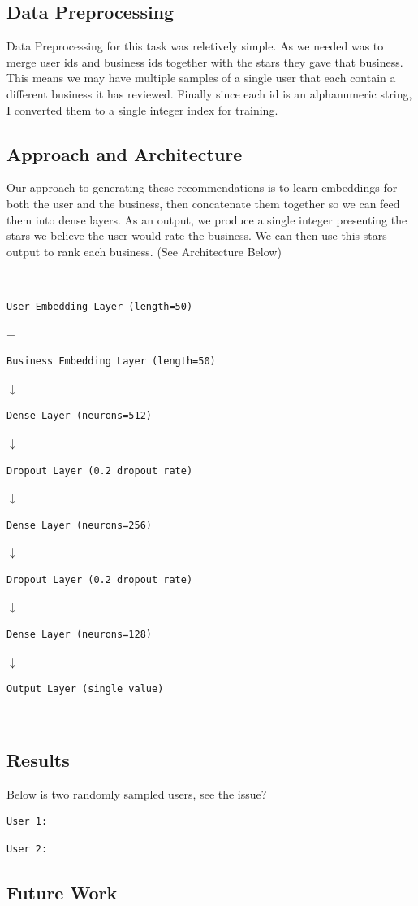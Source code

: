 \documentclass{article}
\begin{document}
\subsection*{Data Preprocessing}

Data Preprocessing for this task was reletively simple. As we needed was to merge user ids and business ids together with the stars they gave that business. This means we may have multiple samples of a single user that each contain a different business it has reviewed. Finally since each id is an alphanumeric string, I converted them to a single integer index for training.

\subsection*{Approach and Architecture}

Our approach to generating these recommendations is to learn embeddings for both the user and the business, then concatenate them together so we can feed them into dense layers. As an output, we produce a single integer presenting the stars we believe the user would rate the business. We can then use this stars output to rank each business. (See Architecture Below)

\mbox{}\\
\begin{verbatim}
User Embedding Layer (length=50)
\end{verbatim}
$+$
\begin{verbatim}
Business Embedding Layer (length=50)
\end{verbatim}
$\downarrow$
\begin{verbatim}
Dense Layer (neurons=512)
\end{verbatim}
$\downarrow$
\begin{verbatim}
Dropout Layer (0.2 dropout rate)
\end{verbatim}
$\downarrow$
\begin{verbatim}
Dense Layer (neurons=256)
\end{verbatim}
$\downarrow$
\begin{verbatim}
Dropout Layer (0.2 dropout rate)
\end{verbatim}
$\downarrow$
\begin{verbatim}
Dense Layer (neurons=128)
\end{verbatim}
$\downarrow$
\begin{verbatim}
Output Layer (single value)
\end{verbatim}
\mbox{}\\

\subsection*{Results}

Below is two randomly sampled users, see the issue?

\begin{verbatim}
User 1:
\end{verbatim}

\begin{verbatim}
User 2:
\end{verbatim}
\subsection*{Future Work}

\medskip



\end{document}
